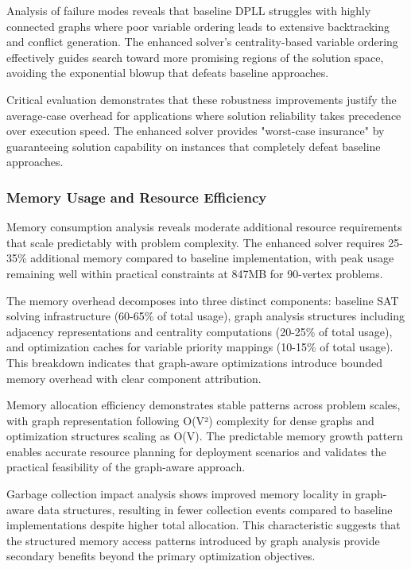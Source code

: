 Analysis of failure modes reveals that baseline DPLL struggles with highly connected graphs where poor variable ordering leads to extensive backtracking and conflict generation. The enhanced solver's centrality-based variable ordering effectively guides search toward more promising regions of the solution space, avoiding the exponential blowup that defeats baseline approaches.

Critical evaluation demonstrates that these robustness improvements justify the average-case overhead for applications where solution reliability takes precedence over execution speed. The enhanced solver provides "worst-case insurance" by guaranteeing solution capability on instances that completely defeat baseline approaches.

\subsubsection{Memory Usage and Resource Efficiency}

Memory consumption analysis reveals moderate additional resource requirements that scale predictably with problem complexity. The enhanced solver requires 25-35\% additional memory compared to baseline implementation, with peak usage remaining well within practical constraints at 847MB for 90-vertex problems.

The memory overhead decomposes into three distinct components: baseline SAT solving infrastructure (60-65\% of total usage), graph analysis structures including adjacency representations and centrality computations (20-25\% of total usage), and optimization caches for variable priority mappings (10-15\% of total usage). This breakdown indicates that graph-aware optimizations introduce bounded memory overhead with clear component attribution.

Memory allocation efficiency demonstrates stable patterns across problem scales, with graph representation following O(V²) complexity for dense graphs and optimization structures scaling as O(V). The predictable memory growth pattern enables accurate resource planning for deployment scenarios and validates the practical feasibility of the graph-aware approach.

Garbage collection impact analysis shows improved memory locality in graph-aware data structures, resulting in fewer collection events compared to baseline implementations despite higher total allocation. This characteristic suggests that the structured memory access patterns introduced by graph analysis provide secondary benefits beyond the primary optimization objectives.

